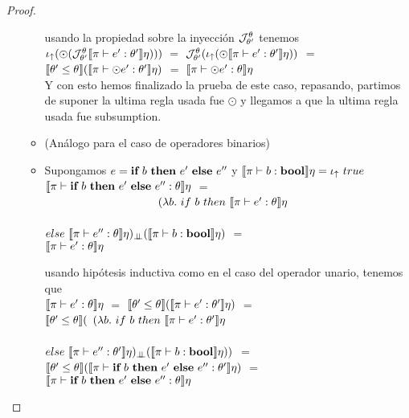 \begin{proof}
\begin{itemize}
\begin{itemize}
usando la propiedad sobre la inyecci\'on $\mathcal{J}_{\theta'}^{\theta}$ tenemos\\

$\iota_{\uparrow} (\odot (\mathcal{J}_{\theta'}^{\theta} \llbracket \pi \vdash e' : \theta' \rrbracket\eta)))$ $=$
$\mathcal{J}_{\theta'}^{\theta} (\iota_{\uparrow} (\odot \llbracket \pi \vdash e' : \theta' \rrbracket\eta))$ $=$\\
$\llbracket \theta' \leq \theta \rrbracket(\llbracket \pi \vdash \odot e' : \theta' \rrbracket\eta)$ $=$
$\llbracket \pi \vdash \odot e' : \theta \rrbracket\eta$\\

Y con esto hemos finalizado la prueba de este caso, repasando, partimos de suponer
la ultima regla usada fue $\odot$ y llegamos a que la ultima regla usada fue subsumption.

\item (An\'alogo para el caso de operadores binarios)

\item Supongamos $e = \textbf{if} \ b \ \textbf{then} \ e' \ \textbf{else} \ e''$ y 
$\semBrcks{\pi \vdash b : \boolt}\eta = \iotabot \ true$\\

$\llbracket \pi \vdash \textbf{if} \ b \ \textbf{then} \ e' \ \textbf{else} \ e'' : \theta \rrbracket\eta$ $=$\\
\indent \ \ \ \ \ \ \ \ \ \ \ \ \ \ \ \ \ \ \ \
$(\lambda b. \ if \ b \ then \ \semBrcks{\pi \vdash e' : \theta}\eta$\\
\indent \ \ \ \ \ \ \ \ \ \ \ \ \ \ \ \ \ \ \ \ \ \ \ \ \ \ \ \ \ \ \ \ \ \ \ \
$else \ \semBrcks{\pi \vdash e'' : \theta}\eta)_{\dbot} 
							(\semBrcks{\pi \vdash b : \boolt}\eta)$ $=$\\
$\llbracket \pi \vdash e' : \theta \rrbracket\eta$

usando hip\'otesis inductiva como en el caso del operador unario, tenemos que\\

$\llbracket \pi \vdash e' : \theta \rrbracket\eta$ $=$ 
$\llbracket \theta' \leq \theta \rrbracket(\llbracket \pi \vdash e' : \theta' \rrbracket\eta)$ $=$\\
$\llbracket \theta' \leq \theta \rrbracket($
$(\lambda b. \ if \ b \ then \ \llbracket \pi \vdash e' : \theta' \rrbracket\eta$\\
\indent \ \ \ \ \ \ \ \ \ \ \ \ \ \ \ \ \ \ \ \ \ \ \ \ \ \ \ \ \ \ \ \
$else \ \semBrcks{\pi \vdash e'' : \theta'}\eta)_{\dbot} 
						(\semBrcks{\pi \vdash b : \boolt}\eta))$ $=$\\
$\llbracket \theta' \leq \theta \rrbracket
	(\llbracket \pi \vdash \textbf{if} \ b \ \textbf{then} \ e' \ \textbf{else} \ e'' : \theta' \rrbracket\eta)$ $=$\\
$\llbracket \pi \vdash \textbf{if} \ b \ \textbf{then} \ e' \ \textbf{else} \ e'' : \theta \rrbracket\eta$\\


\end{itemize}
\end{itemize}
\end{proof}
